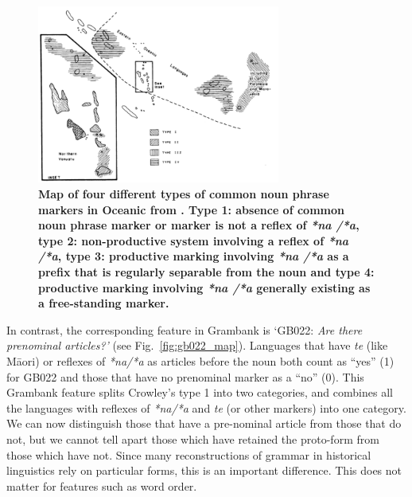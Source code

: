 \documentclass[a4paper,10pt]{article} %
\begin{document}
\begin{figure}
\centering
\includegraphics[width=8cm]{illustrations/crowley_1985_map.png}
\caption[Map of four different types of common noun phrase markers in Oceanic from Crowley(1985).]{\textbf{Map of four different types of common noun phrase markers in Oceanic from \citet[162]{crowley1985common}. Type 1: absence of common noun phrase marker or marker is not a reflex of \emph{*na /*a}, type 2: non-productive system involving a reflex of \emph{*na /*a}, type 3: productive marking involving \emph{*na /*a} as a prefix that is regularly separable from the noun and type 4: productive marking involving \emph{*na /*a} generally existing as a free-standing marker.}}
\label{fig:crowley_map}
\end{figure}

In contrast, the corresponding feature in Grambank is `GB022: \emph{Are there prenominal articles?'} (see Fig.~\ref{fig:gb022_map}). Languages that have \emph{te} (like M\={a}ori) or reflexes of \emph{*na/*a} as articles before the noun both count as ``yes'' (1) for GB022 and those that have no prenominal marker as a ``no'' (0). This Grambank feature splits Crowley's type 1 into two categories, and combines all the languages with reflexes of \emph{*na/*a} and \emph{te} (or other markers) into one category. We can now distinguish those that have a pre-nominal article from those that do not, but we cannot tell apart those which have retained the proto-form from those which have not. Since many reconstructions of grammar in historical linguistics rely on particular forms, this is an important difference. This does not matter for features such as word order.
\end{document}
